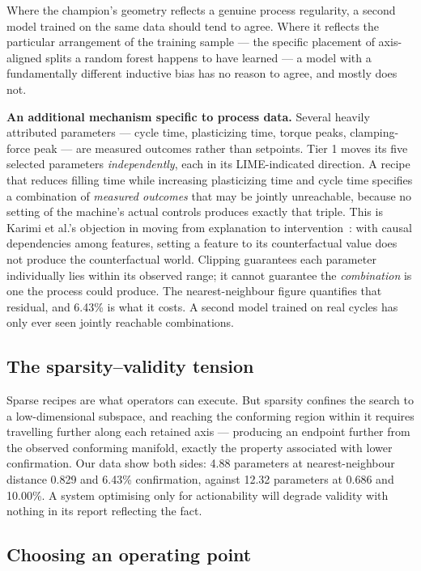 \documentclass[11pt,a4paper]{article}
\begin{document}
Where the champion's geometry reflects a genuine process regularity, a second model trained on the same data should tend to agree. Where it reflects the particular arrangement of the training sample --- the specific placement of axis-aligned splits a random forest happens to have learned --- a model with a fundamentally different inductive bias has no reason to agree, and mostly does not.

\textbf{An additional mechanism specific to process data.} Several heavily attributed parameters --- cycle time, plasticizing time, torque peaks, clamping-force peak --- are measured outcomes rather than setpoints. Tier 1 moves its five selected parameters \emph{independently}, each in its LIME-indicated direction. A recipe that reduces filling time while increasing plasticizing time and cycle time specifies a combination of \emph{measured outcomes} that may be jointly unreachable, because no setting of the machine's actual controls produces exactly that triple. This is Karimi et al.'s objection in moving from explanation to intervention~\cite{karimi2021}: with causal dependencies among features, setting a feature to its counterfactual value does not produce the counterfactual world. Clipping guarantees each parameter individually lies within its observed range; it cannot guarantee the \emph{combination} is one the process could produce. The nearest-neighbour figure quantifies that residual, and 6.43\% is what it costs. A second model trained on real cycles has only ever seen jointly reachable combinations.

\subsection{The sparsity--validity tension}

Sparse recipes are what operators can execute. But sparsity confines the search to a low-dimensional subspace, and reaching the conforming region within it requires travelling further along each retained axis --- producing an endpoint further from the observed conforming manifold, exactly the property associated with lower confirmation. Our data show both sides: 4.88 parameters at nearest-neighbour distance 0.829 and 6.43\% confirmation, against 12.32 parameters at 0.686 and 10.00\%. A system optimising only for actionability will degrade validity with nothing in its report reflecting the fact.

\subsection{Choosing an operating point}
\end{document}

